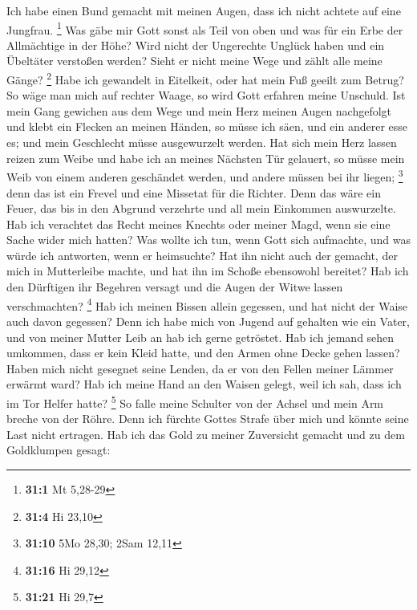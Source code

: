  Ich habe einen Bund gemacht mit meinen Augen, dass ich
nicht achtete auf eine Jungfrau. \footnote{\textbf{31:1} Mt 5,28-29}
 Was gäbe mir Gott sonst als Teil von oben und was für ein
Erbe der Allmächtige in der Höhe?  Wird nicht der Ungerechte
Unglück haben und ein Übeltäter verstoßen werden?  Sieht er
nicht meine Wege und zählt alle meine Gänge? \footnote{\textbf{31:4} Hi
  23,10}  Habe ich gewandelt in Eitelkeit, oder hat mein Fuß
geeilt zum Betrug?  So wäge man mich auf rechter Waage, so
wird Gott erfahren meine Unschuld.  Ist mein Gang gewichen
aus dem Wege und mein Herz meinen Augen nachgefolgt und klebt ein
Flecken an meinen Händen,  so müsse ich säen, und ein
anderer esse es; und mein Geschlecht müsse ausgewurzelt werden.
 Hat sich mein Herz lassen reizen zum Weibe und habe ich an
meines Nächsten Tür gelauert,  so müsse mein Weib von einem
anderen geschändet werden, und andere müssen bei ihr liegen; \footnote{\textbf{31:10}
  5Mo 28,30; 2Sam 12,11}  denn das ist ein Frevel und eine
Missetat für die Richter.  Denn das wäre ein Feuer, das bis
in den Abgrund verzehrte und all mein Einkommen auswurzelte.
 Hab ich verachtet das Recht meines Knechts oder meiner
Magd, wenn sie eine Sache wider mich hatten?  Was wollte
ich tun, wenn Gott sich aufmachte, und was würde ich antworten, wenn er
heimsuchte?  Hat ihn nicht auch der gemacht, der mich in
Mutterleibe machte, und hat ihn im Schoße ebensowohl bereitet?
 Hab ich den Dürftigen ihr Begehren versagt und die Augen
der Witwe lassen verschmachten? \footnote{\textbf{31:16} Hi 29,12}
 Hab ich meinen Bissen allein gegessen, und hat nicht der
Waise auch davon gegessen?  Denn ich habe mich von Jugend
auf gehalten wie ein Vater, und von meiner Mutter Leib an hab ich gerne
getröstet.  Hab ich jemand sehen umkommen, dass er kein
Kleid hatte, und den Armen ohne Decke gehen lassen?  Haben
mich nicht gesegnet seine Lenden, da er von den Fellen meiner Lämmer
erwärmt ward?  Hab ich meine Hand an den Waisen gelegt,
weil ich sah, dass ich im Tor Helfer hatte? \footnote{\textbf{31:21} Hi
  29,7}  So falle meine Schulter von der Achsel und mein
Arm breche von der Röhre.  Denn ich fürchte Gottes Strafe
über mich und könnte seine Last nicht ertragen.  Hab ich
das Gold zu meiner Zuversicht gemacht und zu dem Goldklumpen gesagt:
